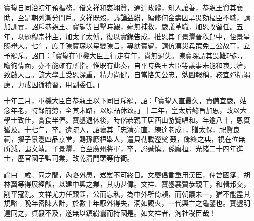 \begin{pinyinscope}
寶鋆自同治初年預樞務，偕文祥和衷翊贊，通達政體，知人讓善，恭親王資其襄助，至是朝列漸分門戶。文祥既歿，議論益紛，編修何金壽因旱災劾樞臣不職，請加訓責，詔斥恭親王、寶鋆等目擊時艱，毫無補救，嚴議革職，加恩改留任。五年，以題穆宗神主，加太子太傅，復以實錄告成，推恩其子景灃晉秩郎中，侄景星賜舉人。七年，庶子陳寶琛以星變陳言，專劾寶鋆，請仿漢災異策免三公故事，立予罷斥。詔曰：「寶鋆在軍機大臣上行走有年，尚無過失。陳寶琛謂其畏難巧卸，瞻徇情面，亦不能確有所指。惟既有此奏，自平時與王大臣等議事未能和衷共濟，致啟人言。該大學士受恩深重，精力尚健，自當恪矢公忠，勉圖報稱，務宜殫精竭慮，力戒因循積習，用副委任。」

十年三月，軍機大臣自恭親王以下同日斥罷，詔：「寶鋆入直最久，責備宜嚴，姑念年老，特錄前勞，全其末路，以原品休致。」十二年，皇太后懿旨加恩，改以大學士致仕，賞食半俸。寶鋆退休後，時偕恭親王居西山游覽唱和。年逾八十，恩賚猶及。十七年，卒。遺疏入，詔褒其「忠清亮直，練達老成」，贈太保，祀賢良祠，擢子景灃四品京堂，賜孫廕桓舉人，遣貝勒載瀅奠叕，飾終之典，視在位無所減，謚文靖。子景灃，官至廣州將軍，卒，謚誠慎。孫廕桓，光緒二十四年進士，歷官國子監司業，改乾清門頭等侍衛。

論曰：咸、同之間，內憂外患，岌岌不可終日。文慶倡言重用漢臣，俾曾國籓、胡林翼等得展經猷，以建中興之業，其功甚偉。文祥、寶鋆襄贊恭親王，和輯邦交，削平寇亂。文祥尤力任艱鉅，公而忘私，為中外所倚賴，而朝議未一，猶不能盡其規略；晚年密陳大計，於數十年馭外得失，洞如觀火，一代興亡之龜鑒也。寶鋆明達同之，貞毅不及，遂無以鎮紛囂而持國是。如文祥者，洵社稷臣哉！


\end{pinyinscope}